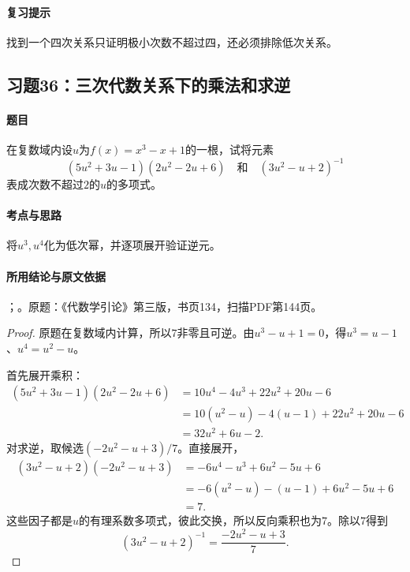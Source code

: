 \paragraph{复习提示}

找到一个四次关系只证明极小次数不超过四，还必须排除低次关系。



\subsection{习题36：三次代数关系下的乘法和求逆}

\label{ex:3:36}

\paragraph{题目}

在复数域内设$u$为$f(x)=x^3-x+1$的一根，试将元素
\[
(5u^2+3u-1)(2u^2-2u+6)\quad\text{和}\quad(3u^2-u+2)^{-1}
\]
表成次数不超过$2$的$u$的多项式。

\paragraph{考点与思路}

将$u^3,u^4$化为低次幂，并逐项展开验证逆元。

\paragraph{所用结论与原文依据}

；。原题：《代数学引论》第三版，书页134，扫描PDF第144页。


\begin{proof}

原题在复数域内计算，所以$7$非零且可逆。由$u^3-u+1=0$，得$u^3=u-1$、$u^4=u^2-u$。

首先展开乘积：
\begin{align*}
(5u^2+3u-1)(2u^2-2u+6)
&=10u^4-4u^3+22u^2+20u-6\\
&=10(u^2-u)-4(u-1)+22u^2+20u-6\\
&=32u^2+6u-2.
\end{align*}
对求逆，取候选$(-2u^2-u+3)/7$。直接展开，
\begin{align*}
(3u^2-u+2)(-2u^2-u+3)
&=-6u^4-u^3+6u^2-5u+6\\
&=-6(u^2-u)-(u-1)+6u^2-5u+6\\
&=7.
\end{align*}
这些因子都是$u$的有理系数多项式，彼此交换，所以反向乘积也为$7$。除以$7$得到
\[
(3u^2-u+2)^{-1}=\frac{-2u^2-u+3}{7}.
\]

\end{proof}

